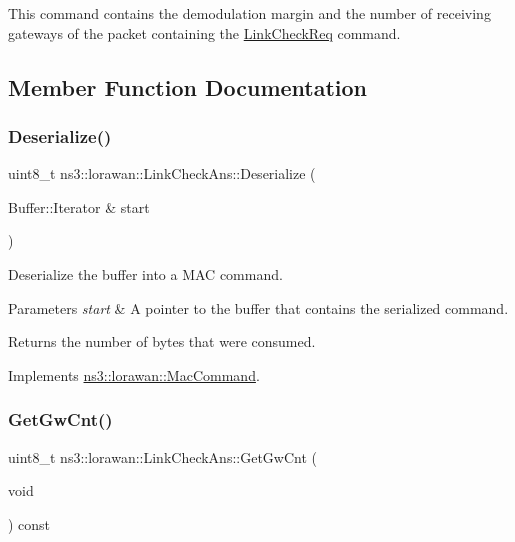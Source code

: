 This command contains the demodulation margin and the number of receiving gateways of the packet containing the \hyperlink{classns3_1_1lorawan_1_1LinkCheckReq}{Link\+Check\+Req} command. 

\subsection{Member Function Documentation}
\mbox{\label{classns3_1_1lorawan_1_1LinkCheckAns_a6e3087a8b109129cb3e53f29625f9fbf}} 
\subsubsection{\texorpdfstring{Deserialize()}{Deserialize()}}
{\footnotesize\ttfamily uint8\+\_\+t ns3\+::lorawan\+::\+Link\+Check\+Ans\+::\+Deserialize (\begin{DoxyParamCaption}\item[{Buffer\+::\+Iterator \&}]{start }\end{DoxyParamCaption})\hspace{0.3cm}{\ttfamily [virtual]}}

Deserialize the buffer into a M\+AC command.


\begin{DoxyParams}{Parameters}
{\em start} & A pointer to the buffer that contains the serialized command. \\
\hline
\end{DoxyParams}
\begin{DoxyReturn}{Returns}
the number of bytes that were consumed. 
\end{DoxyReturn}


Implements \hyperlink{classns3_1_1lorawan_1_1MacCommand_af12d223a71a67196bce498f1240eda75}{ns3\+::lorawan\+::\+Mac\+Command}.

\mbox{\label{classns3_1_1lorawan_1_1LinkCheckAns_a031c9ac33bfac632ff32b1cf2f67232a}} 
\subsubsection{\texorpdfstring{Get\+Gw\+Cnt()}{GetGwCnt()}}
{\footnotesize\ttfamily uint8\+\_\+t ns3\+::lorawan\+::\+Link\+Check\+Ans\+::\+Get\+Gw\+Cnt (\begin{DoxyParamCaption}\item[{void}]{ }\end{DoxyParamCaption}) const}

